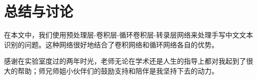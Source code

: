 \documentclass[winfonts]{njuthesis}
\begin{document}
\chapter{总结与讨论}
在本文中，我们使用预处理层-卷积层-循环卷积层-转录层网络来处理手写中文文本识别的问题。这种网络很好地结合了卷积网络和循环网络各自的优势。



\begin{acknowledgement}
感谢在实验室度过的两年时光，老师无论在学术还是人生的指导上都对我起到了很大的帮助；师兄师姐小伙伴们的鼓励支持和陪伴是我坚持下去的动力。
\end{acknowledgement}

\end{document}

